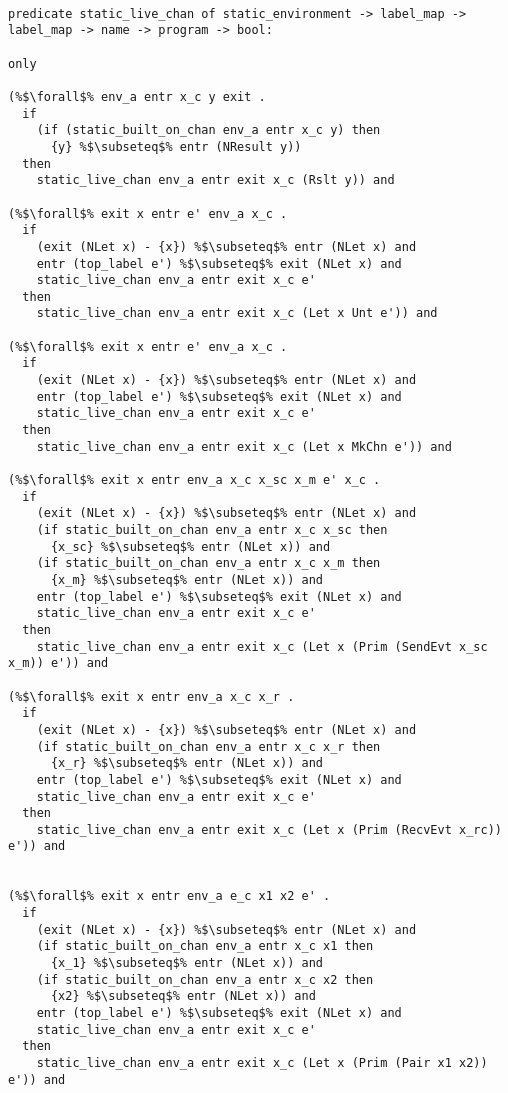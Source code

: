 \documentclass{article}
\begin{document}
\begin{lstlisting}[language=logic, style=codestyle1, escapechar=\%]

predicate static_live_chan of static_environment -> label_map -> label_map -> name -> program -> bool:
    
only

(%$\forall$% env_a entr x_c y exit .
  if
    (if (static_built_on_chan env_a entr x_c y) then
      {y} %$\subseteq$% entr (NResult y))
  then
    static_live_chan env_a entr exit x_c (Rslt y)) and

(%$\forall$% exit x entr e' env_a x_c .
  if 
    (exit (NLet x) - {x}) %$\subseteq$% entr (NLet x) and
    entr (top_label e') %$\subseteq$% exit (NLet x) and
    static_live_chan env_a entr exit x_c e'
  then 
    static_live_chan env_a entr exit x_c (Let x Unt e')) and

(%$\forall$% exit x entr e' env_a x_c .
  if
    (exit (NLet x) - {x}) %$\subseteq$% entr (NLet x) and
    entr (top_label e') %$\subseteq$% exit (NLet x) and
    static_live_chan env_a entr exit x_c e'
  then 
    static_live_chan env_a entr exit x_c (Let x MkChn e')) and

(%$\forall$% exit x entr env_a x_c x_sc x_m e' x_c .
  if
    (exit (NLet x) - {x}) %$\subseteq$% entr (NLet x) and
    (if static_built_on_chan env_a entr x_c x_sc then
      {x_sc} %$\subseteq$% entr (NLet x)) and
    (if static_built_on_chan env_a entr x_c x_m then 
      {x_m} %$\subseteq$% entr (NLet x)) and
    entr (top_label e') %$\subseteq$% exit (NLet x) and
    static_live_chan env_a entr exit x_c e'
  then
    static_live_chan env_a entr exit x_c (Let x (Prim (SendEvt x_sc x_m)) e')) and

(%$\forall$% exit x entr env_a x_c x_r .    
  if
    (exit (NLet x) - {x}) %$\subseteq$% entr (NLet x) and
    (if static_built_on_chan env_a entr x_c x_r then
      {x_r} %$\subseteq$% entr (NLet x)) and
    entr (top_label e') %$\subseteq$% exit (NLet x) and
    static_live_chan env_a entr exit x_c e'
  then
    static_live_chan env_a entr exit x_c (Let x (Prim (RecvEvt x_rc)) e')) and


(%$\forall$% exit x entr env_a e_c x1 x2 e' .
  if
    (exit (NLet x) - {x}) %$\subseteq$% entr (NLet x) and
    (if static_built_on_chan env_a entr x_c x1 then
      {x_1} %$\subseteq$% entr (NLet x)) and
    (if static_built_on_chan env_a entr x_c x2 then
      {x2} %$\subseteq$% entr (NLet x)) and
    entr (top_label e') %$\subseteq$% exit (NLet x) and
    static_live_chan env_a entr exit x_c e'
  then
    static_live_chan env_a entr exit x_c (Let x (Prim (Pair x1 x2)) e')) and


\end{lstlisting}
\end{document}
